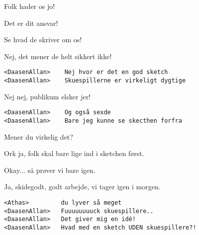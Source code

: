 \documentclass[a4paper,11pt]{article}
\begin{document}
\begin{sketch}
 Folk hader os jo!

 Det er dit ansvar!

 Se hvad de skriver om os!



 Nej, det mener de helt sikkert ikke!


\begin{verbatim}
<DaasenAllan>    Nej hvor er det en god sketch
<DaasenAllan>    Skuespillerne er virkeligt dygtige
\end{verbatim}

 Nej nej, publikum elsker jer!

\begin{verbatim}
<DaasenAllan>    Og også sexde
<DaasenAllan>    Bare jeg kunne se skecthen forfra
\end{verbatim}

 Mener du virkelig det?

 Ork ja, folk skal bare lige ind i sketchen først.


 Okay... så prøver vi bare igen.

 Ja, skidegodt, godt arbejde, vi tager igen i morgen.



\begin{verbatim}
<Athas>         du lyver så meget
<DaasenAllan>   Fuuuuuuuuck skuespillere..
<DaasenAllan>   Det giver mig en idé!
<DaasenAllan>   Hvad med en sketch UDEN skuespillere?!
\end{verbatim}


\end{sketch}
\end{document}
